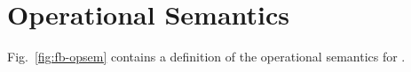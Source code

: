 \section{Operational Semantics}

Fig.~\ref{fig:fb-opsem} contains a definition of the operational semantics for \fbname.




